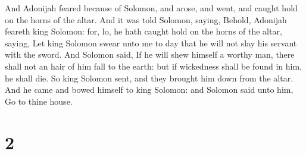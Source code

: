  And Adonijah feared because of Solomon, and arose, and
went, and caught hold on the horns of the altar.  And it
was told Solomon, saying, Behold, Adonijah feareth king Solomon: for,
lo, he hath caught hold on the horns of the altar, saying, Let king
Solomon swear unto me to day that he will not slay his servant with the
sword.  And Solomon said, If he will shew himself a
worthy man, there shall not an hair of him fall to the earth: but if
wickedness shall be found in him, he shall die.  So king
Solomon sent, and they brought him down from the altar. And he came and
bowed himself to king Solomon: and Solomon said unto him, Go to thine
house.

\hypertarget{section-1}{%
\section{2}\label{section-1}}

